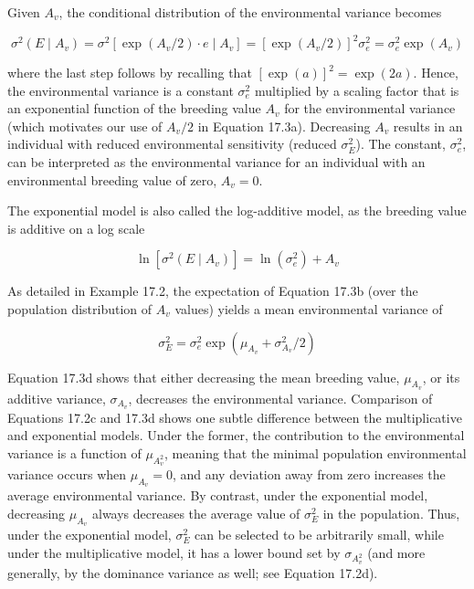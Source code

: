 \documentclass{article}
\begin{document}
Given  $ A_{v} $, the conditional distribution of the environmental variance becomes

\begin{equation}
\sigma^{2}(E\mid A_{v})=\sigma^{2}\left[\exp(A_{v}/2)\cdot e\mid A_{v}\right]=\left[\exp(A_{v}/2)\right]^{2}\sigma_{e}^{2}=\sigma_{e}^{2}\exp\left(A_{v}\right)
\tag{17.3b}
\label{eq:17_3b}
\end{equation}

where the last step follows by recalling that  $ [\exp(a)]^2 = \exp(2a) $. Hence, the environmental variance is a constant  $ \sigma_e^2 $ multiplied by a scaling factor that is an exponential function of the breeding value  $ A_v $ for the environmental variance (which motivates our use of  $ A_v/2 $ in Equation 17.3a). Decreasing  $ A_v $ results in an individual with reduced environmental sensitivity (reduced  $ \sigma_E^2 $). The constant,  $ \sigma_e^2 $, can be interpreted as the environmental variance for an individual with an environmental breeding value of zero,  $ A_v = 0 $.

The exponential model is also called the log-additive model, as the breeding value is additive on a log scale

\begin{equation}
\ln\left[\sigma^{2}(E\mid A_{v})\right]=\ln\left(\sigma_{e}^{2}\right)+A_{v}
\tag{17.3c}
\label{eq:17_3c}
\end{equation}

As detailed in Example 17.2, the expectation of Equation 17.3b (over the population distribution of  $ A_{v} $ values) yields a mean environmental variance of

\begin{equation}
\sigma_{E}^{2}=\sigma_{e}^{2}\exp\left(\mu_{A_{v}}+\sigma_{A_{v}}^{2}/2\right)
\tag{17.3d}
\label{eq:17_3d}
\end{equation}

Equation 17.3d shows that either decreasing the mean breeding value,  $ \mu_{A_v} $, or its additive variance,  $ \sigma_A_v $, decreases the environmental variance. Comparison of Equations 17.2c and 17.3d shows one subtle difference between the multiplicative and exponential models. Under the former, the contribution to the environmental variance is a function of  $ \mu_A_v^2 $, meaning that the minimal population environmental variance occurs when  $ \mu_{A_v} = 0 $, and any deviation away from zero increases the average environmental variance. By contrast, under the exponential model, decreasing  $ \mu_{A_v} $ always decreases the average value of  $ \sigma_E^2 $ in the population. Thus, under the exponential model,  $ \sigma_E^2 $ can be selected to be arbitrarily small, while under the multiplicative model, it has a lower bound set by  $ \sigma_A_v^2 $ (and more generally, by the dominance variance as well; see Equation 17.2d).
\end{document}
